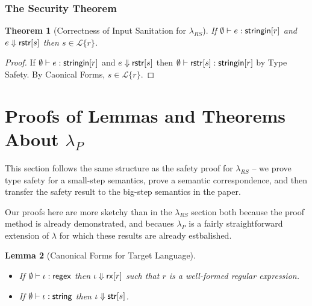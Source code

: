 \documentclass[11pt,leqno]{article}
\newtheorem{thm}{Theorem}
\newtheorem{lem}[thm]{Lemma}
\theoremstyle{definition}
\newcommand{\Lagr}{\mathcal{L}}
\newcommand{\lang}[1]{\Lagr\{#1\}}
\newcommand{\lambdas}{\lambda_{RS}}
\newcommand{\lambdap}{\lambda_P}
\newcommand{\stringin}[1]{{\sf stringin}[#1]}
\renewcommand{\tstr}[1]{{{\sf str}[#1]}}
\newcommand{\rx}[1]{ {\sf rx}[#1] }
\newcommand{\str}{{\sf string}}
\newcommand{\regex}{{\sf regex}}
\newcommand{\treduces}{ \Downarrow }
\newcommand{\sreduces}{ \Downarrow }
\begin{document}
\subsubsection{The Security Theorem}\label{sec:securitythm}

\begin{thm}[Correctness of Input Sanitation for $\lambdas$]\label{thm:scorrect}
  If  $\emptyset \vdash e : \stringin{r}$ and $e \sreduces \rstr{s}$ then $s \in \lang{r}$.
\end{thm}
\begin{proof}
If $\emptyset \vdash e : \stringin{r}$ and $e \sreduces \rstr{s}$ then $\emptyset \vdash \rstr{s} : \stringin{r}$ by Type Safety.
By Caonical Forms, $s \in \lang{r}$.
\end{proof}


\section{Proofs of Lemmas and Theorems About $\lambdap$}

This section follows the same structure as the safety proof for $\lambdas$ --
we prove type safety for a small-step semantics, prove a semantic correspondence,
and then transfer the safety result to the big-step semantics in the paper.

Our proofs here are more sketchy than in the $\lambdas$ section both because the
proof method is already demonstrated, and becaues $\lambdap$ is a fairly straightforward
extension of $\lambda$ for which these results are already estbalished.

\begin{lem}[Canonical Forms for Target Language]
~
\begin{itemize}
\item 
If $\emptyset \vdash \iota : \regex$ then $\iota \treduces \rx{r}$ such that $r$ is a well-formed regular expression. 
\item 
If $\emptyset \vdash \iota : \str$ then $\iota \treduces \tstr{s}$.
\end{itemize}
\end{lem}
\end{document}

